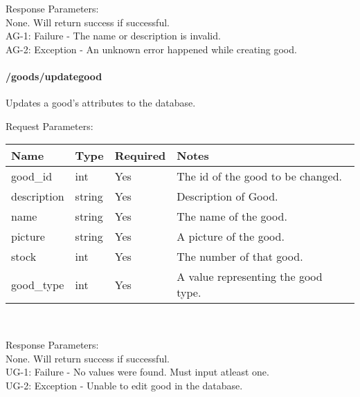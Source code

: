 \documentclass{article}[11pt]
\begin{document}
\noindent
Response Parameters: \\
None. Will return success if successful. \\

\ErrorsSession
AG-1: Failure - The name or description is invalid. \\
AG-2: Exception - An unknown error happened while creating good. \\



\paragraph{/goods/updategood}\textbf{}

Updates a good's attributes to the database.

\noindent
Request Parameters:

\begin{tabular}{|l|l|l|l|}
\hline
\textbf{Name} & \textbf{Type} & \textbf{Required} & \textbf{Notes} \\
\hline
good\_id & int & Yes & The id of the good to be changed. \\
description & string & Yes & Description of Good. \\
name & string & Yes & The name of the good. \\
picture & string & Yes & A picture of the good. \\
stock & int & Yes & The number of that good. \\
good\_type & int & Yes & A value representing the good type. \\
\hline
\end{tabular} \\

\noindent

\noindent
Response Parameters: \\
None. Will return success if successful. \\

\ErrorsSession
UG-1: Failure - No values were found. Must input atleast one. \\
UG-2: Exception - Unable to edit good in the database. \\
\end{document}
